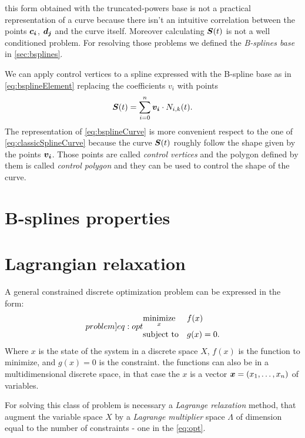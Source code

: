 \documentclass[dissertation.tex]{subfiles}
\begin{document}
this form obtained with the truncated-powers base is not a practical
representation of a curve because
there isn't an intuitive correlation between the points
$\boldsymbol{c_i}$, $\boldsymbol{d_j}$ and the curve itself. Moreover
calculating $\boldsymbol{S}(t)$ is not a well conditioned problem.
 For resolving those problems we
defined the \emph{B-splines base} in \cref{sec:bsplines}.

We can apply control vertices to a spline expressed with the B-spline
base as in \cref{eq:bsplineElement} replacing the coefficients $v_i$
with points
\begin{equation}\label{eq:bsplineCurve}
  \boldsymbol{S}(t)=\sum_{i=0}^n\boldsymbol{v_i}\cdot N_{i,k}(t).
\end{equation}
The representation of \cref{eq:bsplineCurve} is more convenient
respect to the one of 
\cref{eq:classicSplineCurve} because the curve $\boldsymbol{S}(t)$ roughly
follow the shape given by the points $\boldsymbol{v_i}$. Those points are
called \emph{control vertices} and the polygon defined by them is
called \emph{control polygon} and they can be used to control the
shape of the curve.

\section{B-splines properties}\label{sec:bsplineProp}

\section{Lagrangian relaxation}\label{sec:lagrangianRelaxation}
A general constrained discrete optimization problem can be expressed in
the form:
\begin{equation}\label[problem]{eq:opt}
\begin{aligned}
& \underset{x}{\text{minimize}}
& & f(x) \\
& \text{subject to}
& & g(x)=0.
\end{aligned}
\end{equation}
Where $x$ is the state of the system in a discrete space $X$, $f(x)$
is the function to
minimize, and $g(x)=0$ is the constraint. the functions can also be
in a multidimensional discrete space, in that case the $x$ is a vector
$\boldsymbol{x}=(x_1,\dots,x_n)$ of variables.

For solving this class
of problem is necessary a \emph{Lagrange relaxation} method, that
augment the variable space $X$ by a \emph{Lagrange multiplier} space
$\Lambda$ of dimension equal to the number of constraints - one in the
\cref{eq:opt}.
\end{document}
